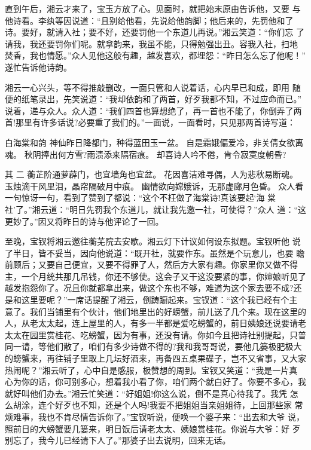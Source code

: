 直到午后，湘云才来了，宝玉方放了心。见面时，就把始末原由告诉他，又要
与他诗看。李纨等因说道：“且别给他看，先说给他韵脚；他后来的，先罚他和了
诗。要好，就请入社；要不好，还要罚他一个东道儿再说。”湘云笑道：“你们忘
了请我，我还要罚你们呢。就拿韵来，我虽不能，只得勉强出丑。容我入社，扫地
焚香，我也情愿。”众人见他这般有趣，越发喜欢，都埋怨：“昨日怎么忘了他呢！”
遂忙告诉他诗韵。

湘云一心兴头，等不得推敲删改，一面只管和人说着话，心内早已和成，即用
随便的纸笔录出，先笑说道：“我却依韵和了两首，好歹我都不知，不过应命而已。”
说着，递与众人。众人道：“我们四首也算想绝了，再一首也不能了，你倒弄了两
首!那里有许多话说?必要重了我们的。”一面说，一面看时，只见那两首诗写道：

白海棠和韵
神仙昨日降都门，种得蓝田玉一盆。
自是霜娥偏爱冷，非关倩女欲离魂。
秋阴捧出何方雪?雨渍添来隔宿痕。
却喜诗人吟不倦，肯令寂寞度朝昏?

其
二
蘅芷阶通萝薜门，也宜墙角也宜盆。
花因喜洁难寻偶，人为悲秋易断魂。
玉烛滴干风里泪，晶帘隔破月中痕。
幽情欲向嫦娥诉，无那虚廊月色昏。
众人看一句惊讶一句，看到了赞到了都说：“这个不枉做了海棠诗!真该要起‘海
棠社’了。”湘云道：“明日先罚我个东道儿，就让我先邀一社，可使得？”众人
道：“这更妙了。”因又将昨日的诗与他评论了一回。

至晚，宝钗将湘云邀往蘅芜院去安歇。湘云灯下计议如何设东拟题。宝钗听他
说了半日，皆不妥当，因向他说道：“既开社，就要作东。虽然是个玩意儿，也要
瞻前顾后；又要自己便宜，又要不得罪了人，然后方大家有趣。你家里你又做不得
主，一个月统共那几吊钱，你还不够使。这会子又干这没要紧的事，你婶娘听见了
越发抱怨你了。况且你就都拿出来，做这个东也不够，难道为这个家去要不成?还
是和这里要呢？”一席话提醒了湘云，倒踌蹰起来。宝钗道：“这个我已经有个主
意了。我们当铺里有个伙计，他们地里出的好螃蟹，前儿送了几个来。现在这里的
人，从老太太起，连上屋里的人，有多一半都是爱吃螃蟹的，前日姨娘还说要请老
太太在园里赏桂花、吃螃蟹，因为有事，还没有请。你如今且把诗社别提起，只普
同一请，等他们散了，咱们有多少诗做不得的?我和我哥哥说，要他几篓极肥极大
的螃蟹来，再往铺子里取上几坛好酒来，再备四五桌果碟子，岂不又省事，又大家
热闹呢？”湘云听了，心中自是感服，极赞想的周到。宝钗又笑道：“我是一片真
心为你的话，你可别多心，想着我小看了你，咱们两个就白好了。你要不多心，我
就好叫他们办去。”湘云忙笑道：“好姐姐!你这么说，倒不是真心待我了。我凭
怎么胡涂，连个好歹也不知，还是个人吗!我要不把姐姐当亲姐姐待，上回那些家
常烦难事，我也不肯尽情告诉你了。”宝钗听说，便唤一个婆子来：“出去和大爷
说，照前日的大螃蟹要几篓来，明日饭后请老太太、姨娘赏桂花。你说与大爷：好
歹别忘了，我今儿已经请下人了。”那婆子出去说明，回来无话。

